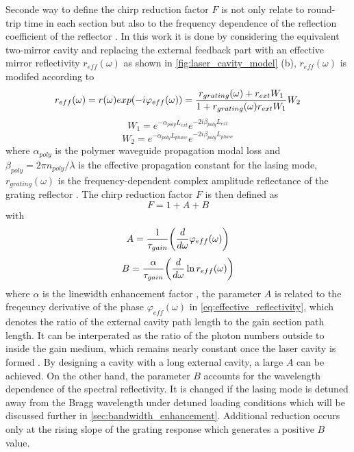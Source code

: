 Seconde way to define the chirp reduction factor $F$ is not only relate to round-trip time in each section but also to the frequency dependence of the reflection coefficient of the reflector \cite{petermann2012laser}. In this work it is done by considering the equivalent two-mirror cavity and replacing the external feedback part with an effective mirror reflectivity $r_{eff}(\omega)$ as shown in \autoref{fig:laser_cavity_model} (b), $r_{eff}(\omega)$ is modifed according to \cite{kazarinov1987relation, coldren2012diode, komljenovic2015widely}
\begin{equation}
    r_{eff}(\omega)=r(\omega)exp\qty(-i\varphi_{eff}(\omega))=\frac{r_{grating}(\omega)+r_{ext}W_1}{1+r_{grating}(\omega)r_{ext}W_1}W_2
    \label{eq:effective_reflectivity}
\end{equation}
\begin{equation}
    W_1=e^{-\alpha_{poly}L_{ext}}e^{-2i\beta_{poly}L_{ext}}
    \label{eq:propogation_external_cavity}
\end{equation}
\begin{equation}
    W_2=e^{-\alpha_{poly}L_{phase}}e^{-2i\beta_{poly}L_{phase}}
    \label{eq:propogation_polymer_wg}
\end{equation}
where $\alpha_{poly}$ is the polymer waveguide propagation modal loss and $\beta_{poly}=2\pi n_{poly}/\lambda$ is the effective propagation constant for the lasing mode, $r_{grating}(\omega)$ is the frequency-dependent complex amplitude reflectance of the grating reflector \cite{yariv1977periodic}.
The chirp reduction factor $F$ is then defined as \cite{kazarinov1987relation, petermann2012laser}
\begin{equation}
    F=1+A+B
    \label{eq:F_factor}
\end{equation}
with
\begin{equation}
    A=\frac{1}{\tau_{gain}}\qty(\dv{\omega}\varphi_{eff}(\omega))
    \label{eq:F_factor_A}
\end{equation}
\begin{equation}
    B=\frac{\alpha}{\tau_{gain}}\qty(\dv{\omega}\ln{r_{eff}(\omega)})
    \label{eq:F_factor_B}
\end{equation}
where $\alpha$ is the linewidth enhancement factor \cite{henry1982theory}, the parameter $A$ is related to the freqeuncy derivative of the phase $\varphi_{eff}(\omega)$ in \autoref{eq:effective_reflectivity}, which denotes the ratio of the external cavity path length to the gain section path length. It can be interperated as the ratio of the photon numbers outside to inside the gain medium, which remains nearly constant once the laser cavity is formed \cite{choi2015evaluation}. By designing a cavity with a long external cavity, a large $A$ can be achieved. On the other hand, the parameter $B$ accounts for the wavelength dependence of the spectral reflectivity. It is changed if the lasing mode is detuned away from the Bragg wavelength under detuned loading conditions \cite{feiste1998optimization, kjebon1997two, chacinski2010impact} which will be discussed further in \autoref{sec:bandwidth_enhancement}. Additional reduction occurs only at the rising slope of the grating response which generates a positive $B$ value.


